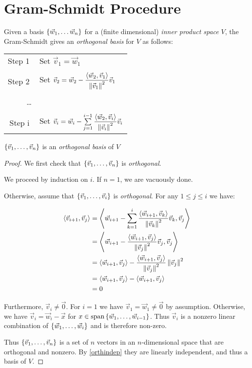 \section{Gram-Schmidt Procedure}
Given a basis $\left\{\vec w_1, \ldots \vec w_n\right\}$ for a (finite dimensional) \emph{inner product space} $V$,
the Gram-Schmidt gives an \emph{orthogonal basis} for $V$ as follows:
\\
\begin{center}
  \begin{tabular}{r l}
    Step \textcircled{1} & Set $\vec v_1 = \vec w_1$ \\ \\
    Step \textcircled{2} & Set $\vec v_2 = \vec w_2 - \dfrac{\left\langle \vec w_2 , \vec v_1 \right\rangle}{\left\lVert\vec v_1\right\rVert^2}\vec v_1$ \\ \\
    \ldots & \\ \\
    Step \textcircled{i} & Set $\vec v_i = \vec w_i - \sum\limits_{j=1}^{i-1}\dfrac{\left\langle \vec w_2 , \vec v_i \right\rangle}{\left\lVert\vec v_i\right\rVert^2}\vec v_i$
  \end{tabular}
\end{center}
\begin{claim}
  $\left\{\vec v_1, \ldots, \vec v_n\right\}$ is an \emph{orthogonal basis} of $V$
\end{claim}
\begin{proof}
  We first check that $\left\{\vec v_1, \ldots, \vec v_n\right\}$ is \emph{orthogonal}.

  We proceed by induction on $i$. If $n = 1$, we are vacuously done.

  Otherwise, assume that $\left\{\vec v_1, \ldots, \vec v_i\right\}$ is \emph{orthogonal}.
  For any $1 \le j \le i$ we have:

  \begin{align}
    \left\langle \vec v_{i+1} , \vec v_j \right\rangle &= \left\langle \vec w_{i+1} - \sum_{k=1}^i \frac{\left\langle \vec w_{i+1} , \vec v_k \right\rangle}{\left\lVert\vec v_k\right\rVert^2}\vec v_k , \vec v_j \right\rangle \\
                                 &= \left\langle \vec w_{i+1} - \frac{\left\langle \vec w_{i+1} , \vec v_j \right\rangle}{\left\lVert\vec v_j\right\rVert^2}\vec v_j , \vec v_j \right\rangle \\
                                 &= \left\langle \vec w_{i+1} , \vec v_j \right\rangle - \frac{\left\langle \vec w_{i+1} , \vec v_j \right\rangle}{\left\lVert\vec v_j\right\rVert^2}\left\lVert\vec v_j\right\rVert^2 \\
                                 &= \left\langle \vec w_{i+1} , \vec v_j \right\rangle - \left\langle \vec w_{i+1} , \vec v_j \right\rangle \\
                                 &= 0
  \end{align}

  Furthermore, $\vec v_i \ne \vec 0$. For $i=1$ we have $\vec v_1 = \vec w_1 \ne \vec 0$ by assumption.
  Otherwise, we have $\vec v_i = \vec w_i - \vec x$ for $x \in \text{span}\left\{\vec w_1, \ldots, \vec w_{i-1}\right\}$.
  Thus $\vec v_i$ is a nonzero linear combination of $\left\{\vec w_1, \ldots, \vec w_i\right\}$ and is therefore non-zero.

  \indent Thus $\left\{\vec v_1, \ldots, \vec v_n\right\}$ is a set of $n$ vectors in an $n$-dimensional space that are
  orthogonal and nonzero. By \ref{orthindep} they are linearly independent, and thus a basis of $V$.
\end{proof}
